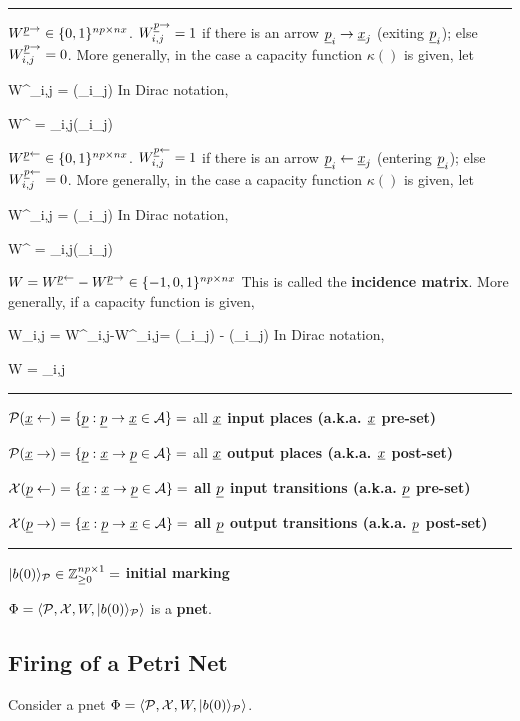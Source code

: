 \hrule
$W^{\rvp\rarrow} \in \bool^{np\times nx}$. 
$W^{\rvp\rarrow}_{i,j} = 1$ if there is an arrow $\rvp_i\rarrow\rvx_j$
(exiting $\rvp_i$);
else $W^{\rvp\rarrow}_{i,j} = 0$. More generally, in the case a capacity function $\kappa()$ is given, let

\beq
W^{\rvp\rarrow}_{i,j} = \kappa(\rvp_i\rarrow \rvx_j)
\eeq
In Dirac notation, 

\beq
W^{\rvp\rarrow} = \sum_{i,j}\kappa(\rvp_i\rarrow \rvx_j)
\eeq


$W^{\rvp\larrow} \in \bool^{np\times nx}$. 
$W^{\rvp\larrow}_{i,j} = 1$ if there is an arrow $\rvp_i\larrow\rvx_j$
(entering $\rvp_i$);
else $W^{\rvp\larrow}_{i,j} = 0$. More generally, in the case a capacity function $\kappa()$ is given, let

\beq
W^{\rvp\larrow}_{i,j} = \kappa(\rvp_i\larrow \rvx_j)
\eeq
In Dirac notation, 

\beq
W^{\rvp\larrow} = \sum_{i,j}\kappa(\rvp_i\larrow \rvx_j)
\eeq

$W =W^{\rvp\larrow}-W^{\rvp\rarrow}\in \{-1, 0, 1\}^{np\times nx}$ This is called the {\bf incidence matrix}.
More generally, if a capacity function is given, 

\beq
W_{i,j} =
 W^{\rvp\larrow}_{i,j}-W^{\rvp\rarrow}_{i,j}=
\kappa(\rvp_i\larrow \rvx_j)
-
\kappa(\rvp_i\rarrow \rvx_j)
\eeq
In Dirac notation, 

\beq
W =  \sum_{i,j}
\eeq

\hrule
$\calp(\rvx\larrow) = \{\rvp : \rvp \rarrow \rvx\in\cala\}=$ all {\bf $\rvx$ input places (a.k.a. $\rvx$ pre-set)}

$\calp(\rvx\rarrow) = \{\rvp : \rvx \rarrow \rvp \in \cala\}=$ all {\bf $\rvx$ output places (a.k.a. $\rvx$ post-set)}

$\calx(\rvp\larrow) = \{\rvx : \rvx \rarrow \rvp \in \cala \}=$ {\bf all
$\rvp$ input transitions (a.k.a. $\rvp$ pre-set)}

$\calx(\rvp\rarrow) = \{\rvx : \rvp \rarrow\rvx \in\cala\}=$ {\bf all $\rvp$ output transitions (a.k.a. $\rvp$ post-set)}

\hrule
$|b(0)\rangle_{\cal P}\in {\mathbb{Z}}_{\geq 0}^{np\times 1} =$ {\bf initial marking}

$\Phi = \left\langle{\cal P}, {\cal X}, W,|b(0)\rangle_{\cal P}\right\rangle$ is a {\bf pnet}.
\subsection{Firing of a Petri Net}
Consider a pnet $\Phi = \left\langle{\cal P}, {\cal X}, W,|b(0)\rangle_{\cal P}\right\rangle$.

